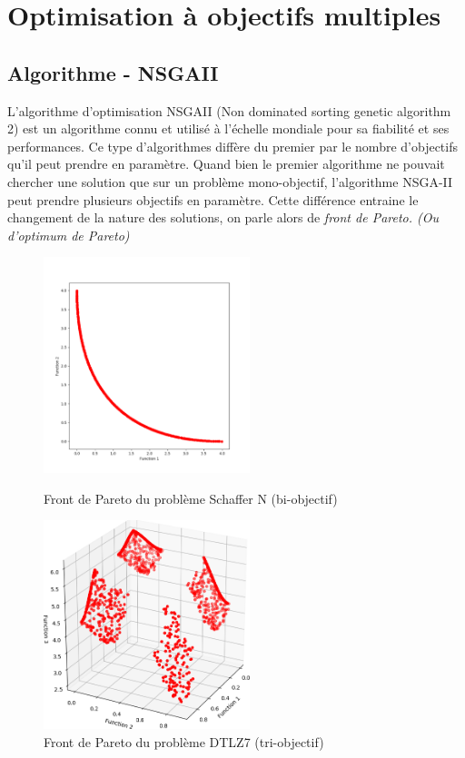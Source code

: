 \documentclass[12pt]{report}
\begin{document}
  \chapter{Optimisation à objectifs multiples}
    \section{Algorithme - NSGAII}
    L'algorithme d'optimisation NSGAII (Non dominated sorting genetic algorithm 2) est un algorithme connu et utilisé à l'échelle mondiale pour sa fiabilité et ses performances. Ce type d'algorithmes diffère du premier par le nombre d'objectifs qu'il peut prendre en paramètre. Quand bien le premier algorithme ne pouvait chercher une solution que sur un problème mono-objectif, l'algorithme NSGA-II peut prendre plusieurs objectifs en paramètre. Cette différence entraine le changement de la nature des solutions, on parle alors de \emph{front de Pareto. (Ou d'optimum de Pareto)}\\

    \begin{figure}[h]
      \begin{minipage}[c]{.46\linewidth}
          \centering
          \includegraphics[width=6cm]{img/4,1,1_Pareto_uni.png}
          \caption{Front de Pareto du problème Schaffer N \cite{wiki5} (bi-objectif)}
          \label{sch}
      \end{minipage}
      \hfill%
      \begin{minipage}[c]{.46\linewidth}
          \centering
          \includegraphics[width=6cm]{img/4,1,1_Pareto.png}
          \caption{Front de Pareto du problème DTLZ7 (tri-objectif)}
      \end{minipage}
    \end{figure}
\end{document}
